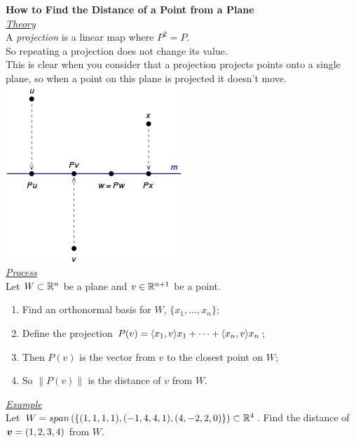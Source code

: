 \documentclass[11pt,a4paper]{article}
\begin{document}
\textbf{How to Find the Distance of a Point from a Plane}\\

\underline{\textit{Theory}}\\
A \textit{projection} is a linear map where $P^2 = P$.\\
So repeating a projection does not change its value.\\
This is clear when you consider that a projection projects points onto a single plane, so when a point on this plane is projected it doesn't move.\\
\includegraphics[scale=0.5]{projection.png}\\

\underline{\textit{Process}}\\
Let $W \subset \mathbb{R}^n$ be a plane and $v \in \mathbb{R}^{n+1}$ be a point.
\begin{enumerate}[label=\roman*)]
  \itemsep0em
  \item Find an orthonormal basis for $W$, $\{x_1, \dots, x_n\}$;
  \item Define the projection $P(v) = \langle x_1, v \rangle x_1 + \dots + \langle x_n, v \rangle x_n$;
  \item Then $P(v)$ is the vector from $v$ to the closest point on $W$;
  \item So $\|P(v)\|$ is the distance of $v$ from $W$.
\end{enumerate}

\underline{\textit{Example}}\\
Let $W = span\left(\left\{(1, 1, 1, 1), (-1, 4, 4, 1), (4, -2, 2, 0)\right\}\right) \subset \mathbb{R}^4$.
Find the distance of $\boldsymbol{v} = (1,2,3,4)$ from $W$.\\
\end{document}
